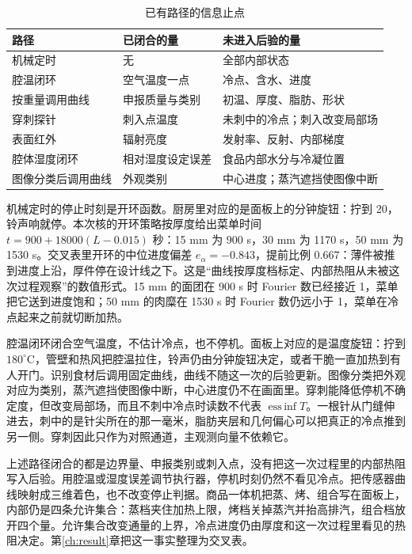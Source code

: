 \begin{table}[htbp]
\centering
\caption{已有路径的信息止点}
\label{tab:stop}
\begin{tabularx}{\textwidth}{lXX}
\toprule
路径 & 已闭合的量 & 未进入后验的量 \\
\midrule
机械定时 & 无 & 全部内部状态 \\
腔温闭环 & 空气温度一点 & 冷点、含水、进度 \\
按重量调用曲线 & 申报质量与类别 & 初温、厚度、脂肪、形状 \\
穿刺探针 & 刺入点温度 & 未刺中的冷点；刺入改变局部场 \\
表面红外 & 辐射亮度 & 发射率、反射、内部梯度 \\
腔体湿度闭环 & 相对湿度设定误差 & 食品内部水分与冷凝位置 \\
图像分类后调用曲线 & 外观类别 & 中心进度；蒸汽遮挡使图像中断 \\
\bottomrule
\end{tabularx}
\end{table}

机械定时的停止时刻是开环函数。厨房里对应的是面板上的分钟旋钮：拧到 20，铃声响就停。本次核的开环策略按厚度给出菜单时间 \(t=900+18000(L-0.015)\) 秒：15 mm 为 900 s，30 mm 为 1170 s，50 mm 为 1530 s。交叉表里开环的中位进度偏差 \(e_{\alpha}=-0.843\)，提前比例 \(0.667\)：薄件被推到进度上沿，厚件停在设计线之下。这是“曲线按厚度档标定、内部热阻从未被这次过程观察”的数值形式。15 mm 的面团在 900 s 时 Fourier 数已经接近 1，菜单把它送到进度饱和；50 mm 的肉糜在 1530 s 时 Fourier 数仍远小于 1，菜单在冷点起来之前就切断加热。

腔温闭环闭合空气温度，不估计冷点，也不停机。面板上对应的是温度旋钮：拧到 \(180^\circ\mathrm{C}\)，管壁和热风把腔温拉住，铃声仍由分钟旋钮决定，或者干脆一直加热到有人开门。识别食材后调用固定曲线，曲线不随这一次的后验更新。图像分类把外观对应为类别，蒸汽遮挡使图像中断，中心进度仍不在画面里。穿刺能降低停机不确定度，但改变局部场，而且不刺中冷点时读数不代表 \(\operatorname{ess\,inf} T\)。一根针从门缝伸进去，刺中的是针尖所在的那一毫米，脂肪夹层和几何偏心可以把真正的冷点推到另一侧。穿刺因此只作为对照通道，主观测向量不依赖它。

上述路径闭合的都是边界量、申报类别或刺入点，没有把这一次过程里的内部热阻写入后验。用腔温或湿度误差调节执行器，停机时刻仍然不看见冷点。把传感器曲线映射成三维着色，也不改变停止判据。商品一体机把蒸、烤、组合写在面板上，内部仍是四条允许集合：蒸档夹住加热上限，烤档关掉蒸汽并抬高排汽，组合档放开四个量。允许集合改变通量的上界，冷点进度仍由厚度和这一次过程里看见的热阻决定。第\ref{ch:result}章把这一事实整理为交叉表。

